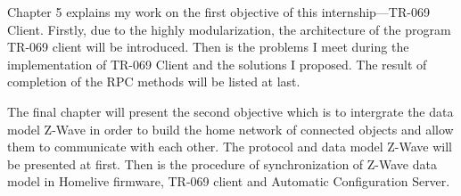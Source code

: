 Chapter 5 explains my work on the first objective of this internship---TR-069 Client. Firstly, due to the highly modularization, the architecture of the program TR-069 client will be introduced. Then is the problems I meet during the implementation of TR-069 Client and the solutions I proposed. The result of completion of the RPC methods will be listed at last.

The final chapter will present the second objective which is to intergrate the data model Z-Wave in order to build the home network of connected objects and allow them to communicate with each other. The protocol and data model Z-Wave will be presented at first. Then is the procedure of synchronization of Z-Wave data model in Homelive firmware, TR-069 client and Automatic Configuration Server.
